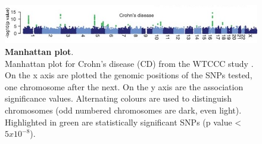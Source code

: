 \begin{figure}[h]
\centering
\includegraphics[width=15cm]{Chapter1/Fig/Manhattan_plots_CD_WTCCC_2007.jpg}
\caption[Manhattan plot]{\textbf{Manhattan plot}.\\
Manhattan plot for Crohn's disease (CD) from the WTCCC study \cite{wellcome2007genome}.
On the x axis are plotted the genomic positions of the SNPs tested, one chromosome after the next.
On the y axis are the association significance values.  
Alternating colours are used to distinguish chromosomes (odd numbered chromosomes are dark, even light).
Highlighted in green are statistically significant SNPs (p value < $5x10^{-8}$).}
\label{fig:manhattan}
\end{figure}





